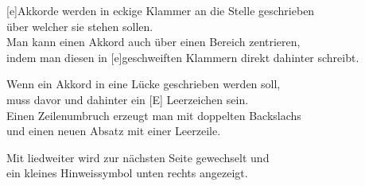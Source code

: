 \def\Titel{Die Gedanken sind frei}  
\def\WorteUndWeise{Wort \& Weise: Deutsches Volkslied}
\def\Referenz{Horst: 123} %


\LiedSetup{}               %

\begin{guitarMagic}

    [e]Akkorde werden in eckige Klammer an die Stelle geschrieben \\
    [H7]über welcher sie stehen sollen.\\
    Man kann einen Akkord auch über einen Bereich zentrieren, \\
    indem man diesen in [e]{geschweiften} Klammern direkt dahinter schreibt.
    
    Wenn ein Akkord in eine Lücke geschrieben werden soll, \\
    muss davor und dahinter ein [E] Leerzeichen sein. \\
    Einen Zeilenumbruch erzeugt man mit doppelten Backslachs \\
    und einen neuen Absatz mit einer Leerzeile.
    \liedweiter
    
    Mit liedweiter wird zur nächsten Seite gewechselt und \\
    ein kleines Hinweissymbol unten rechts angezeigt.
    
\end{guitarMagic}

\WorteUndWeiseSetup



